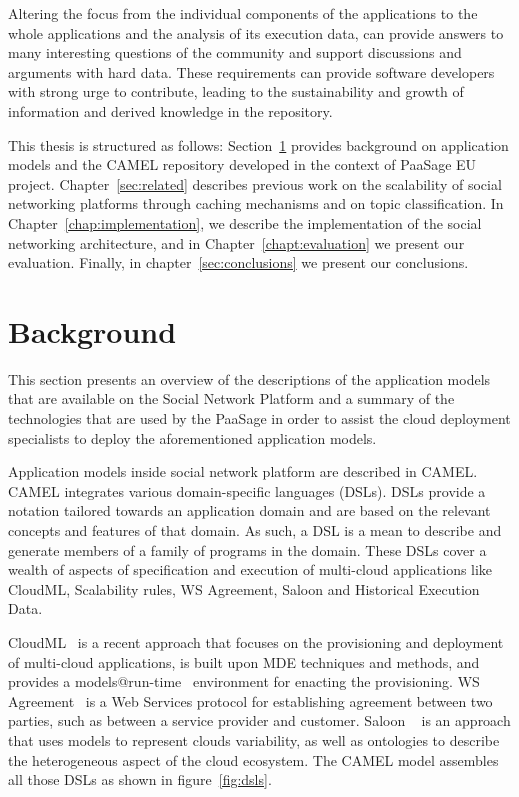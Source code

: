 Altering the focus from the individual components of the applications to the whole applications and the analysis of its execution data, can provide answers to many interesting questions of the community and support discussions and arguments with hard data. 
These requirements can provide software developers with strong urge to contribute, leading to the sustainability and growth of information and derived knowledge in the repository.

This thesis is structured as follows: Section~\ref{sec:background} provides background on application models and the CAMEL repository developed in the context of PaaSage EU project. Chapter~\ref{sec:related} describes previous work on the scalability of social networking platforms through caching mechanisms and on topic classification. In Chapter~\ref{chap:implementation}, we describe the implementation of the social networking architecture, and in Chapter~\ref{chapt:evaluation} we present our evaluation. Finally, in chapter~\ref{sec:conclusions} we present our conclusions.

\section{Background}
\label{sec:background}
This section presents an overview of the descriptions of the application models that are available on the Social Network Platform and a summary of the technologies that are used by the PaaSage in order to assist the cloud deployment specialists to deploy the aforementioned application models.

Application models inside social network platform are described in CAMEL. CAMEL integrates various domain-specific languages (DSLs).
DSLs provide a notation tailored towards an application domain and are based on the relevant concepts and features of that domain. As such, a DSL is a mean to describe and generate members of a family of programs in the domain. 
These DSLs cover a wealth of aspects of specification and execution of multi-cloud applications like CloudML, Scalability rules, WS Agreement, Saloon and Historical Execution Data. 

CloudML~\cite{FerryRossiniCMS13} is a recent approach that focuses on the provisioning and deployment of multi-cloud applications, is built upon MDE techniques and methods, and provides a models@run-time~\cite{models-runtime} environment for enacting the provisioning.  WS Agreement~\cite{andrieux2007web} is a Web Services protocol for establishing agreement between two parties, such as between a service provider and customer. Saloon ~\cite{quinton2013towards} is an approach that uses models to represent clouds variability, as well as ontologies to describe the heterogeneous aspect of the cloud ecosystem. The CAMEL model assembles all those DSLs as shown in figure~\ref{fig:dsls}.

